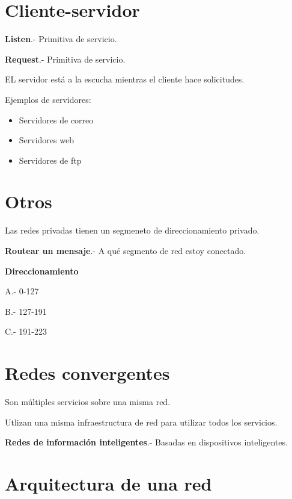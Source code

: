 \documentclass{article}
\begin{document}
\section{Cliente-servidor}

\textbf{Listen}.- Primitiva de servicio.
\vspace{1em}

\textbf{Request}.- Primitiva de servicio.
\vspace{1em}

EL servidor está a la escucha mientras el cliente hace solicitudes.
\vspace{1em}

Ejemplos de servidores:

\begin{itemize}
	\item
	Servidores de correo
	\item
	Servidores web
	\item
	Servidores de ftp
\end{itemize}
\vspace{1em}

\section{Otros}

Las redes privadas tienen un segmeneto de direccionamiento privado.

\textbf{Routear un mensaje}.- A qué segmento de red estoy conectado.

\textbf{Direccionamiento}
\vspace{1em}

A.- 0-127

B.- 127-191

C.- 191-223

\section{Redes convergentes}

Son múltiples servicios sobre una misma red.
\vspace{1em}

Utlizan una misma infraestructura de red para utilizar todos los servicios.
\vspace{1em}

\textbf{Redes de información inteligentes}.- Basadas en dispositivos inteligentes.

\section{Arquitectura de una red}
\end{document}
